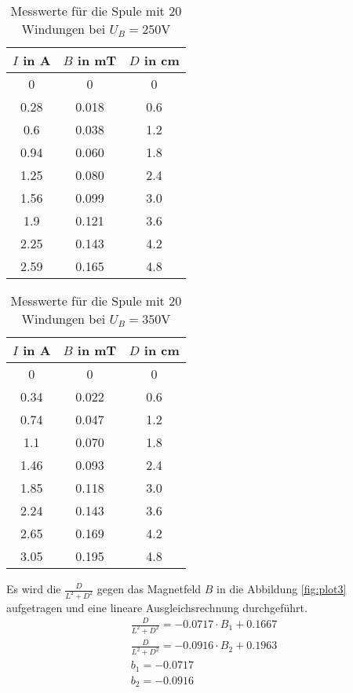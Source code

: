 \FloatBarrier
\begin{table}
  \centering
  \caption{Messwerte für die Spule mit 20 Windungen bei $U_B = 250$V}
  \label{tab:messwerte3}
  \begin{tabular}{c c c}
  \toprule
   $I$ in A & $B$ in mT & $D$ in cm \\
  \midrule
  0    & 0 & 0 \\
  0.28 & 0.018 & 0.6 \\
  0.6  & 0.038 & 1.2 \\
  0.94 & 0.060 & 1.8 \\
  1.25 & 0.080 & 2.4 \\
  1.56 & 0.099 & 3.0 \\
  1.9  & 0.121 & 3.6 \\
  2.25 & 0.143 & 4.2 \\
  2.59 & 0.165 & 4.8 \\
  \bottomrule
  \bottomrule
\end{tabular}
\end{table}

\FloatBarrier
\begin{table}
  \centering
  \caption{Messwerte für die Spule mit 20 Windungen bei $U_B = 350$V}
  \label{tab:messwerte3}
  \begin{tabular}{c c c}
  \toprule
   $I$ in A & $B$ in mT & $D$ in cm \\
  \midrule
  0    & 0 & 0 \\
  0.34 & 0.022 & 0.6 \\
  0.74  & 0.047 & 1.2 \\
  1.1 & 0.070 & 1.8 \\
  1.46 & 0.093 & 2.4 \\
  1.85 & 0.118 & 3.0 \\
  2.24  & 0.143 & 3.6 \\
  2.65 & 0.169 & 4.2 \\
  3.05 & 0.195 & 4.8 \\
  \bottomrule
  \bottomrule
\end{tabular}
\end{table}

\noindent

Es wird die $\frac{D}{L^2 + D^2}$ gegen das Magnetfeld $B$ in die Abbildung \ref{fig:plot3} aufgetragen und eine lineare Ausgleichsrechnung durchgeführt.
\begin{align*}
  \frac{D}{L^2 +D^2} = -0.0717 \cdot B_1 + 0.1667 \\
  \frac{D}{L^2 +D^2} = -0.0916 \cdot B_2 + 0.1963 \\
  b_1 = -0.0717 \\
  b_2 = -0.0916
\end{align*}

